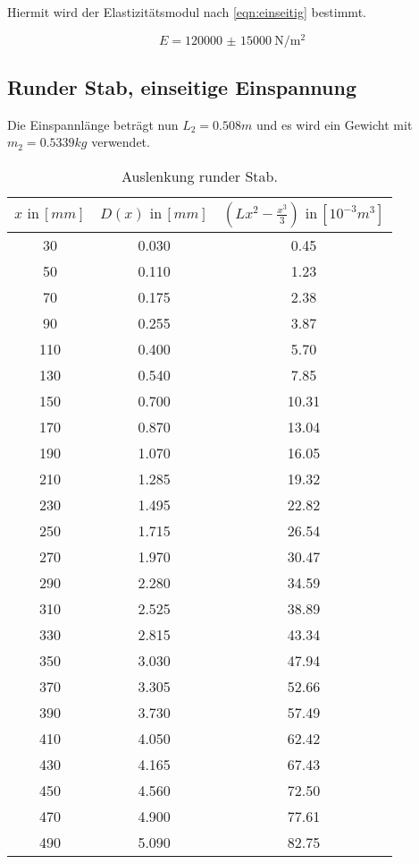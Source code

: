 Hiermit wird der Elastizitätsmodul nach \ref{eqn:einseitig} bestimmt.

\begin{equation*}
  E = \SI{120000(15000)}{\newton\per\square\meter}
\end{equation*}






\subsection{Runder Stab, einseitige Einspannung}
Die Einspannlänge beträgt nun $L_2 = 0.508m$ und es wird ein Gewicht
mit $m_2 = 0.5339 kg $ verwendet.

\begin{table}[h]
  \centering
  \label{tab:lit3}
  \begin{tabular}{ c c c }
    \toprule
    $x \,\, \text{in} \, [mm]$
   &{$D(x) \,\, \text{in} \, [mm]$}
   &{$(Lx^2- \frac{x^3}{3}) \,\, \text{in} \, [10^{-3}m^3]$} \\

    \midrule
    30 & 0.030 & 0.45\\
    50 & 0.110 & 1.23\\
    70 & 0.175 & 2.38\\
    90 & 0.255 & 3.87\\
    110& 0.400 & 5.70\\
    130& 0.540 & 7.85\\
    150& 0.700 &10.31\\
    170& 0.870 &13.04\\
    190& 1.070 &16.05\\
    210& 1.285 &19.32\\
    230& 1.495 &22.82\\
    250& 1.715 &26.54\\
    270& 1.970 &30.47\\
    290& 2.280 &34.59\\
    310& 2.525 &38.89\\
    330& 2.815 &43.34\\
    350& 3.030 &47.94\\
    370& 3.305 &52.66\\
    390& 3.730 &57.49\\
    410& 4.050 &62.42\\
    430& 4.165 &67.43\\
    450& 4.560 &72.50\\
    470& 4.900 &77.61\\
    490& 5.090 &82.75\\

    \bottomrule
  \end{tabular}
  \caption{Auslenkung runder Stab.}
\end{table}

